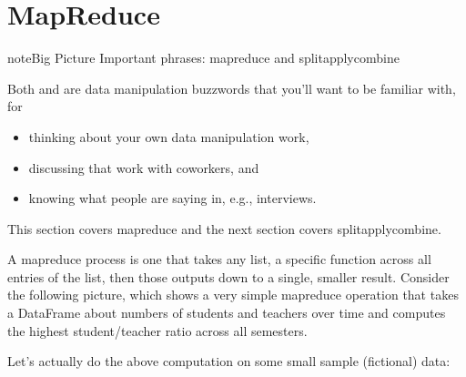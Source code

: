 \documentclass[letterpaper,10pt,english]{jupyterBook}
\begin{document}
\section{Map\sphinxhyphen{}Reduce}
\label{\detokenize{chapter-11-processing-rows:map-reduce}}
\begin{sphinxadmonition}{note}{Big Picture \sphinxhyphen{} Important phrases: map\sphinxhyphen{}reduce and split\sphinxhyphen{}apply\sphinxhyphen{}combine}

\sphinxAtStartPar
Both  and  are data manipulation buzzwords that you’ll want to be familiar with, for
\begin{itemize}
\item {} 
\sphinxAtStartPar
thinking about your own data manipulation work,

\item {} 
\sphinxAtStartPar
discussing that work with coworkers, and

\item {} 
\sphinxAtStartPar
knowing what people are saying in, e.g., interviews.

\end{itemize}

\sphinxAtStartPar
This section covers map\sphinxhyphen{}reduce and the next section covers split\sphinxhyphen{}apply\sphinxhyphen{}combine.
\end{sphinxadmonition}

\sphinxAtStartPar
A map\sphinxhyphen{}reduce process is one that takes any list,  a specific function across all entries of the list, then  those outputs down to a single, smaller result.  Consider the following picture, which shows a very simple map\sphinxhyphen{}reduce operation that takes a DataFrame about numbers of students and teachers over time and computes the highest student/teacher ratio across all semesters.

\sphinxAtStartPar
{}

\sphinxAtStartPar
Let’s actually do the above computation on some small sample (fictional) data:
\end{document}

